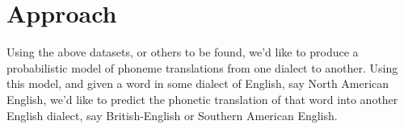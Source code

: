 \documentclass[11pt, letterpaper, oneside]{article}
\begin{document}
\section{Approach}
Using the above datasets, or others to be found, we'd like to produce a probabilistic model of phoneme translations from one dialect to another. Using this model, and given a word in some dialect of English, say North American English, we'd like to predict the phonetic translation of that word into another English dialect, say British-English or Southern American English.

%
\end{document}
